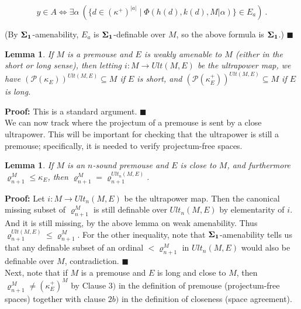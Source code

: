 \documentclass[12pt]{article}
\newtheorem{lem}[thm]{Lemma}
\begin{document}
\[
y \in A \Longleftrightarrow \exists \alpha \ ( \{ d \in (\kappa^+)^{|a|} \mid \Phi ( h (d) , k(d), M | \alpha ) \} \in E_a ) \ .
\]

(By $\bf{\Sigma}_1$-amenability, $E_{a}$ is $\bf{\Sigma}_1$-definable over $M$, so the above formula is $\bf{\Sigma}_1$.) $\blacksquare$ \\

\begin{lem} If $M$ is a premouse and $E$ is weakly amenable to $M$ (either in the short or long sense), then letting $i: M \longrightarrow Ult(M , E)$ be the ultrapower map, we have $(\mathcal{P}(\kappa_E ))^{Ult(M, E)} \subseteq M$ if $E$ is short, and $(\mathcal{P}(\kappa_E^+ ))^{Ult(M, E)} \subseteq M$ if $E$ is long.
\end{lem}

\textbf{Proof:}  This is a standard argument.  $\blacksquare$\\

We can now track where the projectum of a premouse is sent by a close ultrapower.  This will be important for checking that the ultrapower is still a premouse; specifically, it is needed to verify projectum-free spaces.\\



\begin{lem} If $M$ is an $n$-sound premouse and $E$ is close to $M$, and furthermore $\varrho_{n + 1}^M \leq \kappa_E$, then $ \varrho_{n + 1}^M = \varrho_{n+1}^{Ult_n(M, E)}$.
\end{lem}

\textbf{Proof:}  Let $i: M \longrightarrow Ult_n (M , E)$ be the ultrapower map.  Then the canonical missing subset of $\varrho_{n+1}^M$ is still definable over $Ult_n(M, E)$ by elementarity of $i$.  And it is still missing, by the above lemma on weak amenability.  Thus $\varrho_{n+1}^{Ult(M, E)} \leq \varrho_{n+1}^M$.  For the other inequality, note that $\bf{\Sigma}_1$-amenability tells us that any definable subset of an ordinal $< \varrho_{n+1}^M$ in $Ult_n(M, E)$ would also be definable over $M$, contradiction. $\blacksquare$\\


Next, note that if $M$ is a premouse and $E$ is long and close to $M$, then $\varrho_{n+1}^M \neq ( \kappa_E^+ )^M$ by Clause $3)$ in the definition of premouse (projectum-free spaces) together with clause $2b)$ in the definition of closeness (space agreement).\\
\end{document}
